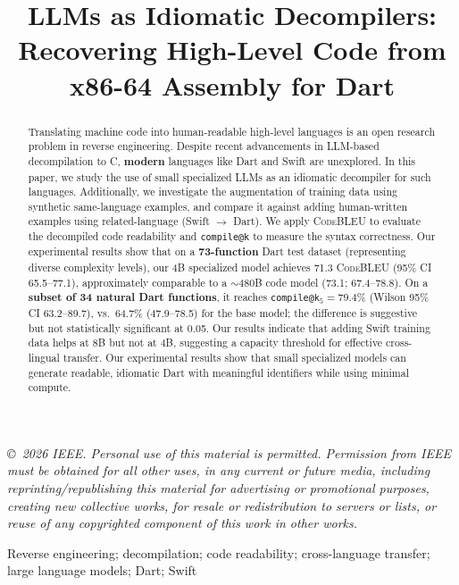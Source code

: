 \documentclass[10pt,conference]{IEEEtran}
\title{LLMs as Idiomatic Decompilers: Recovering High-Level Code from x86-64 Assembly for Dart}
\author{
\IEEEauthorblockN{Raafat Abualazm\IEEEauthorrefmark{1} and Ayman Abo Elhassan\IEEEauthorrefmark{1}}
\IEEEauthorblockA{\IEEEauthorrefmark{1}Faculty of Engineering, Cairo University, Giza, Egypt\\
Email: raafat.202210476@eng-st.cu.edu.eg, ayman.abo.elmaaty@eng.cu.edu.eg}
}
\makeatletter
\newcommand{\codebleu}{\textsc{CodeBLEU}\xspace}
\newcommand{\compileatk}{\texttt{compile@k}\xspace}
\makeatother
\begin{document}
\maketitle

\begingroup
\footnotesize
\noindent\textit{\copyright~2026 IEEE. Personal use of this material is permitted. Permission from IEEE must be obtained for all other uses, in any current or future media, including reprinting/republishing this material for advertising or promotional purposes, creating new collective works, for resale or redistribution to servers or lists, or reuse of any copyrighted component of this work in other works.}
\par\endgroup
\vspace{0.4em}

\begin{abstract}
Translating machine code into human-readable high-level languages is an open research problem in reverse engineering. Despite recent advancements in LLM-based decompilation to C, \textbf{modern} languages like Dart and Swift are unexplored. In this paper, we study the use of small specialized LLMs as an idiomatic decompiler for such languages. Additionally, we investigate the augmentation of training data using synthetic same-language examples, and compare it against adding human-written examples using related-language (Swift $\rightarrow$ Dart). We apply \codebleu{} to evaluate the decompiled code readability and \compileatk{} to measure the syntax correctness. Our experimental results show that on a \textbf{73-function} Dart test dataset (representing diverse complexity levels), our 4B specialized model achieves 71.3 \codebleu{} (95\% CI 65.5--77.1), approximately comparable to a $\sim$480B code model (73.1; 67.4--78.8). On a \textbf{subset of 34 natural Dart functions}, it reaches \compileatk{}$_{5} = 79.4\%$ (Wilson 95\% CI 63.2--89.7), vs.\ 64.7\% (47.9--78.5) for the base model; the difference is suggestive but not statistically significant at 0.05. Our results indicate that adding Swift training data helps at 8B but not at 4B, suggesting a capacity threshold for effective cross-lingual transfer. Our experimental results show that small specialized models can generate readable, idiomatic Dart with meaningful identifiers while using minimal compute.
\end{abstract}

\begin{IEEEkeywords}
Reverse engineering; decompilation; code readability; cross-language transfer; large language models; Dart; Swift
\end{IEEEkeywords}
\end{document}
